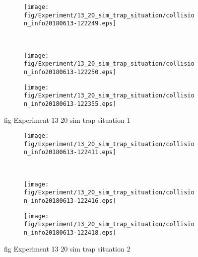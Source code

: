 \begin{figure}[H]
	\centering
	\begin{subfigure}[b]{0.45\textwidth}
		\texttt{[image: fig/Experiment/13\_20\_sim\_trap\_situation/collision\_info20180613-122249.eps]}
		\caption{}
		\label{fig:Experiment:13_20_sim_trap_situation:collision_info20180613-122249}
	\end{subfigure}
	~
	\begin{subfigure}[b]{0.45\textwidth}
		\texttt{[image: fig/Experiment/13\_20\_sim\_trap\_situation/collision\_info20180613-122250.eps]}
		\caption{}
		\label{fig:Experiment:13_20_sim_trap_situation:collision_info20180613-122250}
	\end{subfigure}

	\begin{subfigure}[b]{0.45\textwidth}
		\texttt{[image: fig/Experiment/13\_20\_sim\_trap\_situation/collision\_info20180613-122355.eps]}
		\caption{}
		\label{fig:Experiment:13_20_sim_trap_situation:collision_info20180613-122355}
	\end{subfigure}
	\caption{fig Experiment 13 20 sim trap situation 1}
	\label{fig:Experiment:13_20_sim_trap_situation:1}
\end{figure}

\begin{figure}[H]
	\centering
	\begin{subfigure}[b]{0.45\textwidth}
		\texttt{[image: fig/Experiment/13\_20\_sim\_trap\_situation/collision\_info20180613-122411.eps]}
		\caption{}
		\label{fig:Experiment:13_20_sim_trap_situation:collision_info20180613-122411}
	\end{subfigure}
	~
	\begin{subfigure}[b]{0.45\textwidth}
		\texttt{[image: fig/Experiment/13\_20\_sim\_trap\_situation/collision\_info20180613-122416.eps]}
		\caption{}
		\label{fig:Experiment:13_20_sim_trap_situation:collision_info20180613-122416}
	\end{subfigure}

	\begin{subfigure}[b]{0.45\textwidth}
		\texttt{[image: fig/Experiment/13\_20\_sim\_trap\_situation/collision\_info20180613-122418.eps]}
		\caption{}
		\label{fig:Experiment:13_20_sim_trap_situation:collision_info20180613-122418}
	\end{subfigure}
	\caption{fig Experiment 13 20 sim trap situation 2}
	\label{fig:Experiment:13_20_sim_trap_situation:2}
\end{figure}

